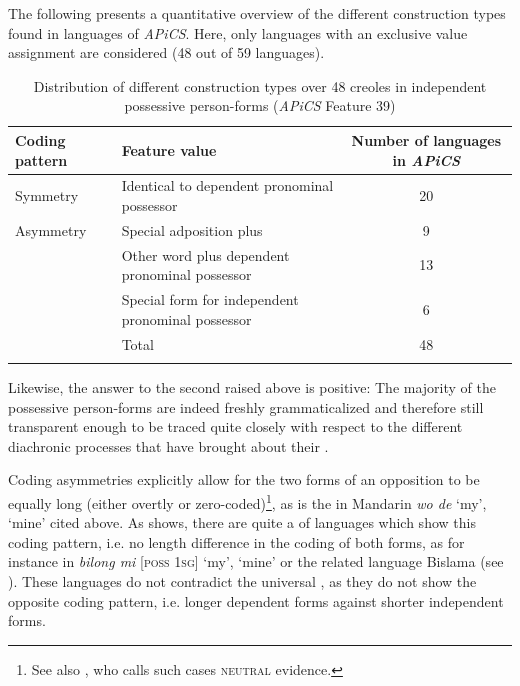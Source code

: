 \documentclass[output=paper]{langsci/langscibook}
\begin{document}
The following  presents a quantitative overview of the different construction types found in  languages of \textit{APiCS}. Here, only languages with an exclusive value assignment are considered (48 out of 59  languages).

\begin{table}
\begin{tabularx}{\textwidth}{l>{\raggedright}p{5.5cm}S}
\lsptoprule

\bfseries Coding pattern & \bfseries Feature value & \bfseries Number of  languages in \textit{APiCS}\\
\midrule
Symmetry & Identical to dependent pronominal possessor & 20\\

\tablevspace
Asymmetry & Special adposition plus  & 9\\
\tablevspace
 & Other word plus dependent pronominal possessor & 13\\
\tablevspace
 & Special form for independent pronominal possessor & 6\\
\midrule
& Total & 48\\
\lspbottomrule
\end{tabularx}

\caption{Distribution of different construction types over 48 creoles in independent possessive person-forms (\textit{APiCS} Feature 39)}
\label{tab:michaelis:5}
\end{table}

Likewise, the answer to the second  raised above is positive: The majority of the possessive person-forms are indeed freshly grammaticalized and therefore still transparent enough to be traced quite closely with respect to the different diachronic processes that have brought about their . 

Coding asymmetries explicitly allow for the two forms of an opposition to be equally long (either overtly or zero-coded)\footnote{See also \citet[58f.]{Croft1991}, who calls such cases \textsc{neutral} evidence.}, as is the  in Mandarin  \textit{wo de} ‘my’, ‘mine’ cited above. As  shows, there are quite a  of  languages which show this coding pattern, i.e. no length difference in the coding of both forms, as for instance in  \textit{bilong mi} [\textsc{poss} \textsc{1sg}] ‘my’, ‘mine’ or the related language Bislama (see ). These languages do not contradict the universal , as they do not show the opposite coding pattern, i.e. longer dependent forms against shorter independent forms.
\end{document}
